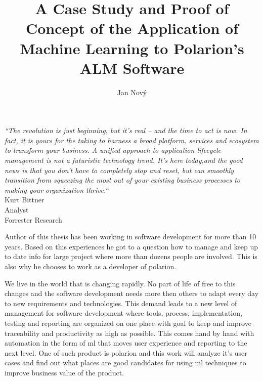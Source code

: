 \documentclass[thesis=M,english]{FITthesis}[2012/06/26]
\title{A Case Study and Proof of Concept of the Application of Machine Learning to Polarion's ALM Software}
\author{Jan Nový} %
\begin{document}


\todototoc
\listoftodos

\begin{introduction}
\begin{center}
	\textit{“The revolution is just beginning, but it’s real – and the time to act is now. In fact, it is yours for the taking to harness a broad platform, services and ecosystem to transform your business. A unified approach to application lifecycle management is not a futuristic technology trend. It’s here today,and the good news is that you don’t have to completely stop and reset, but can smoothly transition from squeezing the most out of your existing business processes to making your organization thrive.“}\\
Kurt Bittner\\
Analyst\\
Forrester Research\\
\end{center}
\end{introduction}

Author of this thesis has been working in software development for more than 10 years. Based on this experiences he got to a question how to manage and keep up to date info for large project where more than dozens people are involved. This is also why he chooses to work as a developer of \acrshort{polarion}.


We live in the world that is changing rapidly. No part of life of free to this changes and the software development needs more then others to adapt every day to new requirements and technologies. This demand leads to a new level of management for software development where tools, process, implementation, testing and reporting are organized on one place with goal to keep and improve traceability and productivity as high as possible. This comes hand by hand with automation in the form of \acrshort{ml} that moves user experience and reporting to the next level. One of such product is \acrshort{polarion}\cite{polarion_alm} and this work will analyze it's user cases and find out what places are good candidates for using \acrshort{ml} techniques to improve business value of the product. 
\end{document}

